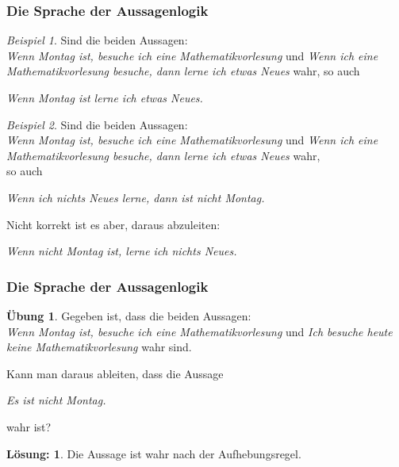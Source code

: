 \documentclass[hyperref={pdfpagelabels=false}]{beamer}
\theoremstyle{plain}%
\theoremstyle{definition}
\newtheorem*{uebung}{Übung}
\newtheorem*{sol}{Lösung:}
\theoremstyle{remark}
\newtheorem*{beispiel}{Beispiel}
\begin{document}
\begin{frame}
\frametitle{Die Sprache der Aussagenlogik}

\begin{beispiel}
Sind die beiden Aussagen: \\ \textit{Wenn Montag ist, besuche ich eine Mathematikvorlesung}  und 
\textit{Wenn ich eine Mathematikvorlesung besuche, dann lerne ich etwas Neues} wahr, so auch 

\textit{Wenn Montag ist lerne ich etwas Neues.}
\end{beispiel}

\pause 

\begin{beispiel}
Sind die beiden Aussagen: \\ \textit{Wenn Montag ist, besuche ich eine Mathematikvorlesung}  und 
\textit{Wenn ich eine Mathematikvorlesung besuche, dann lerne ich etwas Neues} wahr, \\ so auch 

\textit{Wenn ich nichts Neues lerne, dann ist nicht Montag.}

\bigbreak

\pause 
Nicht korrekt ist es aber, daraus abzuleiten:

\textit{ Wenn nicht Montag ist, lerne ich nichts Neues.}
\end{beispiel}
\end{frame}

\begin{frame}
\frametitle{Die Sprache der Aussagenlogik}

\begin{uebung}
Gegeben ist, dass die beiden Aussagen: \\ 
\textit{Wenn Montag ist, besuche ich eine Mathematikvorlesung}  und 
\textit{Ich besuche heute keine Mathematikvorlesung} wahr sind. 

Kann man daraus ableiten, dass die Aussage 

\medbreak

\textit{Es ist nicht Montag.}

\medbreak

wahr ist? 
\end{uebung}

\bigbreak \bigbreak
\pause \pause 

\begin{sol}
Die Aussage ist wahr nach der Aufhebungsregel. 
\end{sol}
\end{frame}
\end{document}
